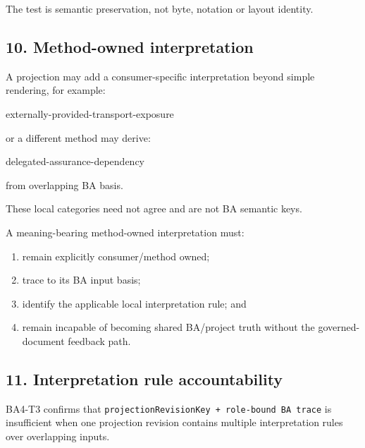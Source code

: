 \documentclass[
  11pt,
  a4paper,
]{article}
\newenvironment{Shaded}{}{}
\newcommand{\NormalTok}[1]{#1}
\providecommand{\tightlist}{%
  \setlength{\itemsep}{0pt}\setlength{\parskip}{0pt}}
\begin{document}
The test is semantic preservation, not byte, notation or layout
identity.

\subsection{10. Method-owned
interpretation}\label{method-owned-interpretation}

A projection may add a consumer-specific interpretation beyond simple
rendering, for example:

\begin{Shaded}
\begin{Highlighting}[]
\NormalTok{externally{-}provided{-}transport{-}exposure}
\end{Highlighting}
\end{Shaded}

or a different method may derive:

\begin{Shaded}
\begin{Highlighting}[]
\NormalTok{delegated{-}assurance{-}dependency}
\end{Highlighting}
\end{Shaded}

from overlapping BA basis.

These local categories need not agree and are not BA semantic keys.

A meaning-bearing method-owned interpretation must:

\begin{enumerate}
\def\labelenumi{\arabic{enumi}.}
\tightlist
\item
  remain explicitly consumer/method owned;
\item
  trace to its BA input basis;
\item
  identify the applicable local interpretation rule; and
\item
  remain incapable of becoming shared BA/project truth without the
  governed-document feedback path.
\end{enumerate}

\subsection{11. Interpretation rule
accountability}\label{interpretation-rule-accountability}

BA4-T3 confirms that
\texttt{projectionRevisionKey\ +\ role-bound\ BA\ trace} is insufficient
when one projection revision contains multiple interpretation rules over
overlapping inputs.
\end{document}
